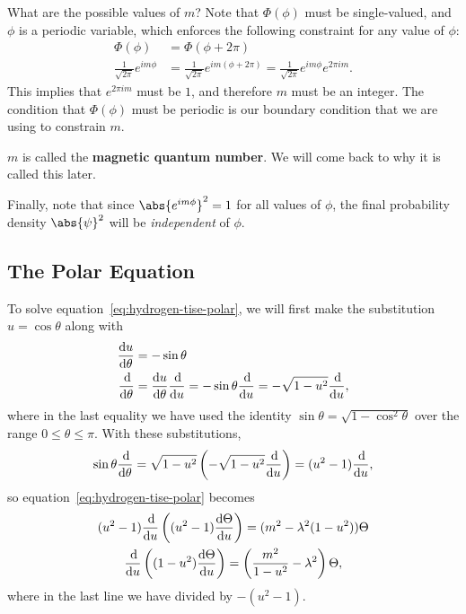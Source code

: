 \documentclass[../quantum_mechanics.tex]{subfiles}
\begin{document}
            What are the possible values of $m$?
            Note that $\Phi(\phi)$ must be single-valued, and $\phi$ is a periodic variable, which enforces the following constraint for any value of $\phi$:
            \begin{align}
                \Phi(\phi)&=\Phi(\phi+2\pi)\\
                \frac{1}{\sqrt{2\pi}}e^{im\phi}&=\frac{1}{\sqrt{2\pi}}e^{im(\phi+2\pi)}=\frac{1}{\sqrt{2\pi}}e^{im\phi}e^{2\pi im}.
            \end{align}
            This implies that $e^{2\pi im}$ must be $1$, and therefore $m$ must be an integer.
            The condition that $\Phi(\phi)$ must be periodic is our boundary condition that we are using to constrain $m$.
            
            $m$ is called the \textbf{magnetic quantum number}.
            We will come back to why it is called this later.

            Finally, note that since $\abs{e^{im\phi}}^2=1$ for all values of $\phi$, the final probability density $\abs{\psi}^2$ will be \textit{independent} of $\phi$.

        \subsection{The Polar Equation}\label{sec:solving-the-hydrogen-atom:subsec:the-polar-equation}
            To solve equation~\ref{eq:hydrogen-tise-polar}, we will first make the substitution $u=\cos\theta$ along with
            \begin{align}
                \dv{u}{\theta}&=-\sin\theta\\
                \dv{}{\theta}&=\dv{u}{\theta}\dv{}{u}=-\sin\theta\dv{}{u}=-\sqrt{1-u^2}\dv{}{u},
            \end{align}
            where in the last equality we have used the identity $\sin\theta=\sqrt{1-\cos^2\theta}$ over the range $0\leq\theta\leq\pi$.
            With these substitutions, 
            \begin{equation}
                \sin\theta\dv{}{\theta}=\sqrt{1-u^2}\left(-\sqrt{1-u^2}\dv{}{u}\right)=(u^2-1)\dv{}{u},
            \end{equation}
            so equation~\ref{eq:hydrogen-tise-polar} becomes
            \begin{gather}
                (u^2-1)\dv{}{u}\left((u^2-1)\dv{\Theta}{u}\right)=(m^2-\lambda^2(1-u^2))\Theta\\
                \dv{}{u}\left((1-u^2)\dv{\Theta}{u}\right)=\left(\frac{m^2}{1-u^2}-\lambda^2\right)\Theta,
            \end{gather}
            where in the last line we have divided by $-(u^2-1)$.
\end{document}
